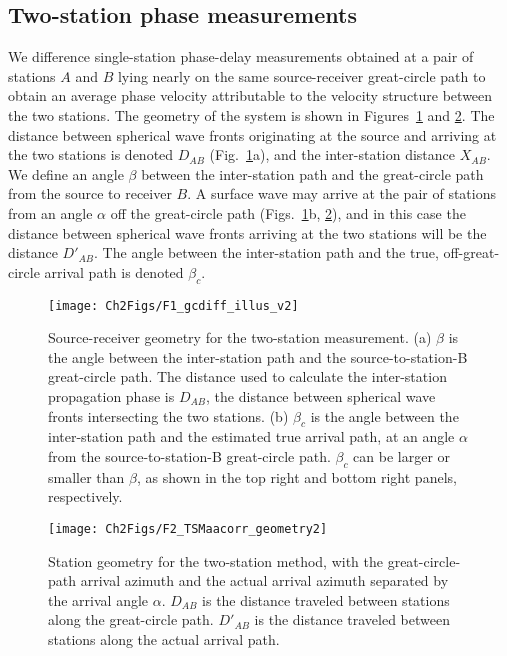 \documentclass[12pt,oneside]{book}
\begin{document}
\subsection{Two-station phase measurements}
We difference single-station phase-delay measurements obtained at a pair of stations $A$ and $B$ lying nearly on the same source-receiver great-circle path to obtain an average phase velocity attributable to the velocity structure between the two stations. The geometry of the system is shown in Figures~\ref{figpv:TSMgeometry} and \ref{figpv:AAcorrgeometry}. The distance between spherical wave fronts originating at the source and arriving at the two stations is denoted $D_{AB}$ (Fig.~\ref{figpv:TSMgeometry}a), and the inter-station distance $X_{AB}$. We define an angle $\beta$ between the inter-station path and the great-circle path from the source to receiver $B$. A surface wave may arrive at the pair of stations from an angle $\alpha$ off the great-circle path (Figs.~\ref{figpv:TSMgeometry}b, \ref{figpv:AAcorrgeometry}), and in this case the distance between spherical wave fronts arriving at the two stations will be the distance $D'_{AB}$. The angle between the inter-station path and the true, off-great-circle arrival path is denoted $\beta_c$. 

\begin{figure} 
\begin{center}
\texttt{[image: Ch2Figs/F1\_gcdiff\_illus\_v2]} 
\caption[Two-station method source-receiver geometry]{Source-receiver geometry for the two-station measurement. (a) $\beta$ is the angle between the inter-station path and the source-to-station-B great-circle path. The distance used to calculate the inter-station propagation phase is $D_{AB}$, the distance between spherical wave fronts intersecting the two stations. (b) $\beta_{c}$ is the angle between the inter-station path and the estimated true arrival path, at an angle $\alpha$ from the source-to-station-B great-circle path. $\beta_c$ can be larger or smaller than $\beta$, as shown in the top right and bottom right panels, respectively. }
\label{figpv:TSMgeometry}
\end{center}
\end{figure}
%	
\begin{figure} 
\begin{center}
\texttt{[image: Ch2Figs/F2\_TSMaacorr\_geometry2]} 
\caption[Detailed two-station method station geometry]{Station geometry for the two-station method, with the great-circle-path arrival azimuth and the actual arrival azimuth separated by the arrival angle $\alpha$. $D_{AB}$ is the distance traveled between stations along the great-circle path. $D'_{AB}$ is the distance traveled between stations along the actual arrival path. }
\label{figpv:AAcorrgeometry}
\end{center}
\end{figure}
%
\end{document}

